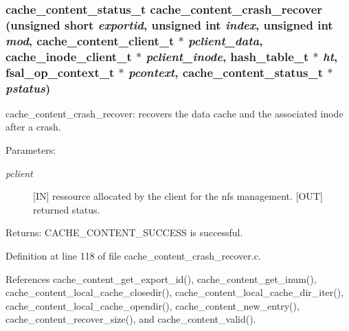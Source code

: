 \subsubsection{\setlength{\rightskip}{0pt plus 5cm}cache\_\-content\_\-status\_\-t cache\_\-content\_\-crash\_\-recover (unsigned short {\em exportid}, unsigned int {\em index}, unsigned int {\em mod}, cache\_\-content\_\-client\_\-t $\ast$ {\em pclient\_\-data}, cache\_\-inode\_\-client\_\-t $\ast$ {\em pclient\_\-inode}, hash\_\-table\_\-t $\ast$ {\em ht}, fsal\_\-op\_\-context\_\-t $\ast$ {\em pcontext}, cache\_\-content\_\-status\_\-t $\ast$ {\em pstatus})}\label{cache__content__crash__recover_8c_a0}


cache\_\-content\_\-crash\_\-recover: recovers the data cache and the associated inode after a crash.

\begin{Desc}
\item[Parameters:]
\begin{description}
\item[{\em pclient}][IN] ressource allocated by the client for the nfs management.  [OUT] returned status.\end{description}
\end{Desc}
\begin{Desc}
\item[Returns:]CACHE\_\-CONTENT\_\-SUCCESS is successful. \end{Desc}


Definition at line 118 of file cache\_\-content\_\-crash\_\-recover.c.

References cache\_\-content\_\-get\_\-export\_\-id(), cache\_\-content\_\-get\_\-inum(), cache\_\-content\_\-local\_\-cache\_\-closedir(), cache\_\-content\_\-local\_\-cache\_\-dir\_\-iter(), cache\_\-content\_\-local\_\-cache\_\-opendir(), cache\_\-content\_\-new\_\-entry(), cache\_\-content\_\-recover\_\-size(), and cache\_\-content\_\-valid().